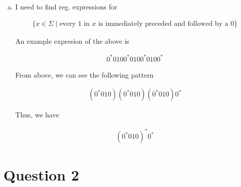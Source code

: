 \documentclass[12pt]{article}
\begin{document}
\begin{enumerate}[a.]

    \item

    \setcounter{equation}{0}

    I need to find reg. expressions for

    \begin{align*}
    \{x \in \Sigma \mid \text{every 1 in $x$ is immediately preceded and followed by a 0}\}
    \end{align*}

    \bigskip

    An example expresion of the above is

    \bigskip

    \begin{align}
        0^*0100^*0100^*0100^*
    \end{align}

    \bigskip

    From above, we can see the following pattern

    \bigskip

    \begin{align}
        (0^*010)(0^*010)(0^*010)0^*
    \end{align}

    \bigskip

    Thus, we have

    \begin{align}
    (0^*010)^*0^*
    \end{align}
\end{enumerate}


\bigskip

\section*{Question 2}
\end{document}
